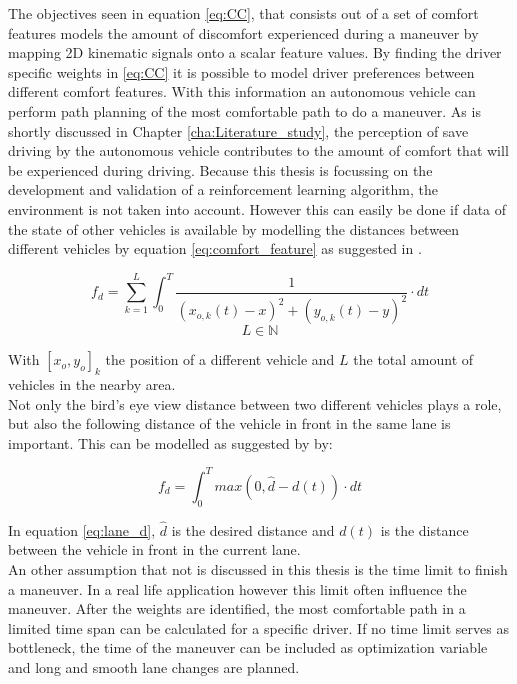 The objectives seen in equation \ref{eq:CC}, that consists out of a set of comfort features models the amount of discomfort experienced during a maneuver by mapping 2D kinematic signals onto a scalar feature values. By finding the driver specific weights in \ref{eq:CC} it is possible to model driver preferences between different comfort features. With this information an autonomous vehicle can perform path planning of the most comfortable path to do a maneuver.  As is shortly discussed in Chapter \ref{cha:Literature_study}, the perception of save driving by the autonomous vehicle contributes to the amount of comfort that will be experienced during driving. Because this thesis is focussing on the development and validation of a reinforcement learning algorithm, the environment is not taken into account. However this can easily be done if data of the state of other vehicles is available by modelling the distances between different vehicles by equation \ref{eq:comfort_feature} as suggested in \cite{Kuderer2015a}. 

\begin{equation}\label{eq:comfort_feature}
f_d= \sum_{k = 1}^{L}\int_{0}^{T}\frac{1}{(x_{o,k}(t)-x)^2+(y_{o,k}(t)-y)^2}\cdot dt
\end{equation}
\[L \in \mathbb{N}\]

With $[x_o,y_o]_k$ the position of a different vehicle and $L$ the total amount of vehicles in the nearby area.\\

Not only the bird's eye view distance between two different vehicles plays a role, but also the following distance of the vehicle in front in the same lane is important. This can be modelled as suggested by \cite{Kuderer2015a} by:  

\begin{equation}\label{eq:lane_d}
f_d= \int_{0}^{T} max(0,\hat{d}-d(t))\cdot dt
\end{equation}

In equation \ref{eq:lane_d}, $\hat{d}$ is the desired distance and $d(t)$ is the distance between the vehicle in front in the current lane.\\


An other assumption that not is discussed in this thesis is the time limit to finish a maneuver. In a real life application however this limit often influence the maneuver. After the weights are identified, the most comfortable path in a limited time span can be calculated for a specific driver. If no time limit serves as bottleneck, the time of the maneuver can be included as optimization variable and long and smooth lane changes are planned. 

